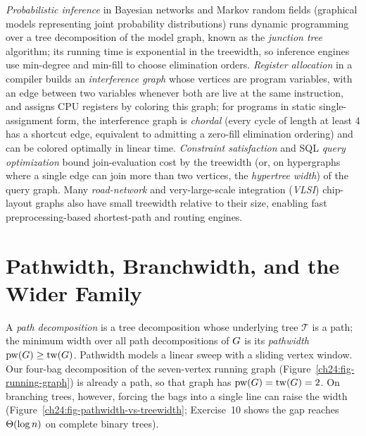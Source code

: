 \begin{applicationbox}
\emph{Probabilistic inference} in Bayesian networks and Markov random fields
(graphical models representing joint probability distributions) runs dynamic
programming over a tree decomposition of the model graph, known as the
\emph{junction tree} algorithm; its running time is exponential in the treewidth,
so inference engines use min-degree and min-fill to choose elimination orders.
\emph{Register allocation} in a compiler builds an \emph{interference graph} whose
vertices are program variables, with an edge between two variables whenever both are
live at the same instruction, and assigns CPU registers by coloring this graph; for
programs in static single-assignment form, the interference graph is \emph{chordal}
(every cycle of length at least $4$ has a shortcut edge, equivalent to admitting a
zero-fill elimination ordering) and can be colored optimally in linear time.
\emph{Constraint satisfaction} and SQL \emph{query optimization} bound join-evaluation
cost by the treewidth (or, on hypergraphs where a single edge can join more than
two vertices, the \emph{hypertree width}) of the query graph. Many
\emph{road-network} and very-large-scale integration (\emph{VLSI}) chip-layout
graphs also have small treewidth relative to their size, enabling fast
preprocessing-based shortest-path and routing engines.
\end{applicationbox}

\section{Pathwidth, Branchwidth, and the Wider Family}
\label{ch24:family}

A \emph{path decomposition} is a tree decomposition whose underlying tree
$\mathcal{T}$ is a path; the minimum width over all path decompositions of $G$
is its \emph{pathwidth} $\operatorname{pw}(G)\ge\operatorname{tw}(G)$. Pathwidth models a
linear sweep with a sliding vertex window. Our four-bag decomposition of the
seven-vertex running graph (Figure~\ref{ch24:fig-running-graph}) is already a path,
so that graph has $\operatorname{pw}(G)=\operatorname{tw}(G)=2$. On branching trees,
however, forcing the bags into a single line can raise the width
(Figure~\ref{ch24:fig-pathwidth-vs-treewidth}; Exercise~10 shows the gap reaches
$\Theta(\log n)$ on complete binary trees).

